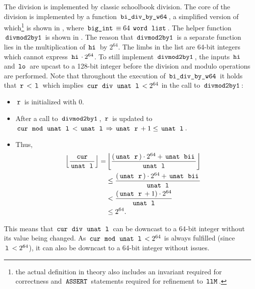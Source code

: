 The division is implemented by classic schoolbook division.
The core of the division is implemented by a function $\,\text{\ttfamily bi\_div\_by\_w64}\,$, a simplified version of which\footnote{the actual definition in theory  also includes an invariant required for correctness and $\,\text{\ttfamily ASSERT}\,$ statements required for refinement to $\,\text{\ttfamily llM}\,$.} is shown in , where $\,\text{\ttfamily big\_int}\, \equiv 64 \; \,\text{\ttfamily word}\, \; \,\text{\ttfamily list}\,$.
The helper function $\,\text{\ttfamily divmod2by1}\,$ is shown in .
The reason that $\,\text{\ttfamily divmod2by1}\,$ is a separate function lies in the multiplication of $\,\text{\ttfamily hi}\,$ by $2^{64}$.
The limbs in the list are 64-bit integers which cannot express $\,\text{\ttfamily hi}\, \cdot 2^{64}$.
To still implement $\,\text{\ttfamily divmod2by1}\,$, the inputs $\,\text{\ttfamily hi}\,$ and $\,\text{\ttfamily lo}\,$ are upcast to a 128-bit integer before the division and modulo operations are performed.
Note that throughout the execution of $\,\text{\ttfamily bi\_div\_by\_w64}\,$ it holds that $\,\text{\ttfamily r}\, < \,\text{\ttfamily l}\,$ which implies $\,\text{\ttfamily cur}\, \; \,\text{\ttfamily div}\, \; \,\text{\ttfamily unat}\, \; \,\text{\ttfamily l}\, < 2^{64}$ in the call to $\,\text{\ttfamily divmod2by1}\,$:
\begin{itemize}
    \item $\,\text{\ttfamily r}\,$ is initialized with $0$.
    \item After a call to $\,\text{\ttfamily divmod2by1}\,$, $\,\text{\ttfamily r}\,$ is updated to $\,\text{\ttfamily cur}\, \; \,\text{\ttfamily mod}\, \; \,\text{\ttfamily unat}\, \; \,\text{\ttfamily l}\, < \,\text{\ttfamily unat}\, \; \,\text{\ttfamily l}\, \Rightarrow \,\text{\ttfamily unat}\, \; \,\text{\ttfamily r}\, + 1 \leq \,\text{\ttfamily unat}\, \; \,\text{\ttfamily l}\,$.
    \item Thus,
    \begin{align*}
        \left \lfloor \frac{\,\text{\ttfamily cur}\,}{\,\text{\ttfamily unat}\, \; \,\text{\ttfamily l}\,} \right \rfloor =
        &\left \lfloor \frac{(\,\text{\ttfamily unat}\, \; \,\text{\ttfamily r}\,)\cdot2^{64} + \,\text{\ttfamily unat}\, \; \,\text{\ttfamily bii}\,}{\,\text{\ttfamily unat}\, \; \,\text{\ttfamily l}\,} \right \rfloor \\
        &\leq \frac{(\,\text{\ttfamily unat}\, \; \,\text{\ttfamily r}\,)\cdot2^{64} + \,\text{\ttfamily unat}\, \; \,\text{\ttfamily bii}\,}{\,\text{\ttfamily unat}\, \; \,\text{\ttfamily l}\,} \\
        &<\frac{(\,\text{\ttfamily unat}\, \; \,\text{\ttfamily r}\, + 1)\cdot2^{64}}{\,\text{\ttfamily unat}\, \; \,\text{\ttfamily l}\,} \\
        &\leq 2^{64}.
    \end{align*}
\end{itemize}

This means that $\,\text{\ttfamily cur}\, \; \,\text{\ttfamily div}\, \; \,\text{\ttfamily unat}\, \; \,\text{\ttfamily l}\,$ can be downcast to a 64-bit integer without its value being changed.
As $\,\text{\ttfamily cur}\, \; \,\text{\ttfamily mod}\, \; \,\text{\ttfamily unat}\, \; \,\text{\ttfamily l}\, < 2^{64}$ is always fulfilled (since $\,\text{\ttfamily l}\, < 2^{64}$), it can also be downcast to a 64-bit integer without issues.

